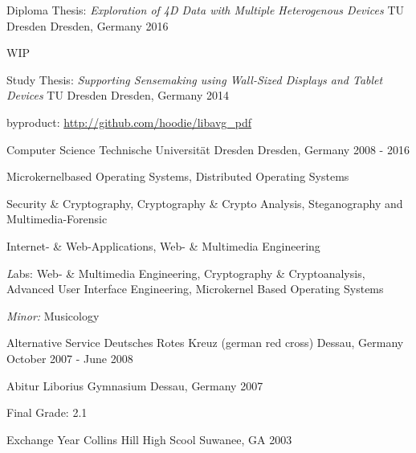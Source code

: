 \begin{cventries}

  \cventry
    {Diploma Thesis: \quad
      \textit{Exploration of 4D Data with Multiple Heterogenous Devices}}
    {TU Dresden}
    {Dresden, Germany}
    {2016}
    {
      \begin{cvitems}
      \item[]{WIP}
      \end{cvitems}
    }

  \cventry
    {Study Thesis:\quad
      \textit{Supporting Sensemaking using Wall-Sized Displays and Tablet Devices}}
    {TU Dresden}
    {Dresden, Germany}
    {2014}
    {
      \begin{cvitems}
      \item[] {byproduct: \url{http://github.com/hoodie/libavg_pdf}}
      \end{cvitems}
    }

  \cventry
    {Computer Science}
    {Technische Universität Dresden}
    {Dresden, Germany}
    {2008 - 2016}
    {
      \begin{cvitems}
      \item {
          Microkernelbased Operating Systems,
          Distributed Operating Systems
        }
      \item {
          Security \& Cryptography,
          Cryptography \& Crypto Analysis,
          Steganography and Multimedia-Forensic
        }
      \item {
          Internet- \& Web-Applications, Web- \& Multimedia Engineering
        }
      \item {
          {\textit Labs:}  Web- \& Multimedia Engineering,
          Cryptography \& Cryptoanalysis,
          Advanced User Interface Engineering,
          Microkernel Based Operating Systems
        }
      \item {\textit{Minor:} Musicology}
      \end{cvitems}
    }

  \cventry
    {Alternative Service}
    {Deutsches Rotes Kreuz (german red cross)}
    {Dessau, Germany}
    {October 2007 - June 2008}
    {
    }

  \cventry
    {Abitur}
    {Liborius Gymnasium}
    {Dessau, Germany}
    {2007}
    {
      \begin{cvitems}
      \item[] {Final Grade: 2.1}
      \end{cvitems}
    }
  \cventry
    {Exchange Year}
    {Collins Hill High Scool}
    {Suwanee, GA}
    {2003}
    {
      \begin{cvitems}
      \end{cvitems}
    }
\end{cventries}
